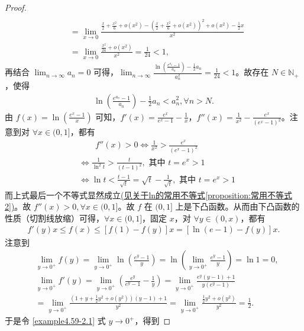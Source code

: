 \documentclass[../../main.tex]{subfiles}
\begin{document}
\begin{proof}
\begin{align*}
\\
&=\lim_{x\rightarrow 0} \frac{\frac{x}{2}+\frac{x^2}{6}+o(x^2)-\left( \frac{x}{2}+\frac{x^2}{6}+o(x^2) \right) ^2+o(x^2)-\frac{1}{2}x}{x^2}
\\
&=\lim_{x\rightarrow 0} \frac{\frac{x^2}{24}+o(x^2)}{x^2}=\frac{1}{24}<1,
\end{align*}
再结合 \(\lim_{n \to \infty} a_n = 0\) 可得，\(\lim_{n \to \infty} \frac{\ln\left(\frac{e^{a_n} - 1}{a_n}\right) - \frac{1}{2} a_n}{a_n^2} = \frac{1}{24} < 1\)。故存在 \(N \in \mathbb{N}_+\)，使得
\begin{align}
\ln\left(\frac{e^{a_n} - 1}{a_n}\right) - \frac{1}{2} a_n < a_n^2,\forall n > N. \label{example4.59-3.1}
\end{align}
由 \(f(x)=\ln\left(\frac{e^x - 1}{x}\right)\) 可知，\(f'(x)=\frac{e^x}{e^x - 1} - \frac{1}{x}\)，\(f''(x)=\frac{1}{x^2} - \frac{e^x}{(e^x - 1)^2}\)。注意到对 \(\forall x \in (0, 1]\)，都有
\begin{align*}
& \quad \quad f''(x) > 0 \Leftrightarrow \frac{1}{x^2} > \frac{e^x}{(e^x - 1)^2}\\
&\Leftrightarrow \frac{1}{\ln^2 t} > \frac{t}{(t - 1)^2},\text{ 其中 }t = e^x > 1\\
&\Leftrightarrow \ln t < \frac{t - 1}{\sqrt{t}} = \sqrt{t} - \frac{1}{\sqrt{t}},\text{ 其中 }t = e^x > 1
\end{align*}
而上式最后一个不等式显然成立\hyperref[proposition:常用不等式2]{(见关于ln的常用不等式\ref{proposition:常用不等式2})}。故 \(f''(x) > 0,\forall x \in (0, 1]\)。故 \(f\) 在 \((0, 1]\) 上是下凸函数。从而由下凸函数的性质（切割线放缩）可得，\(\forall x \in (0, 1]\)，固定 \(x\)，对 \(\forall y \in (0, x)\)，都有
\begin{align}
f'(y) x \leqslant  f(x) \leqslant  [f(1) - f(y)] x = [\ln(e - 1) - f(y)] x. \label{example4.59-2.1}
\end{align}
注意到
\begin{align*}
&\lim_{y \to 0^+} f(y) = \lim_{y \to 0^+} \ln\left(\frac{e^y - 1}{y}\right) = \ln\left(\lim_{y \to 0^+} \frac{e^y - 1}{y}\right) = \ln 1 = 0,\\
&\lim_{y \to 0^+} f'(y) = \lim_{y \to 0^+} \left(\frac{e^y}{e^y - 1} - \frac{1}{y}\right) = \lim_{y \to 0^+} \frac{e^y(y - 1) + 1}{y(e^y - 1)}\\
&= \lim_{y \to 0^+} \frac{(1 + y + \frac{1}{2} y^2 + o(y^2))(y - 1) + 1}{y^2} = \lim_{y \to 0^+} \frac{\frac{1}{2} y^2 + o(y^2)}{y^2} = \frac{1}{2}.
\end{align*}
于是令 \eqref{example4.59-2.1} 式 \(y \to 0^+\)，得到

\end{proof}
\end{document}
